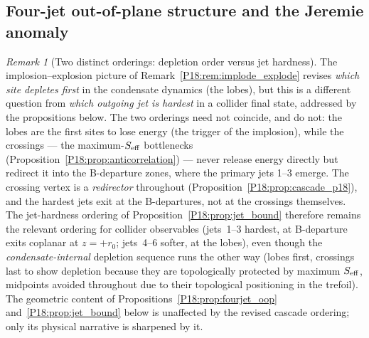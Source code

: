 \documentclass[11pt,a4paper]{article}
\theoremstyle{definition}\newtheorem{definition}[theorem]{Definition}
\theoremstyle{remark}
\newtheorem{remark}[theorem]{Remark}
\begin{document}
\subsection{Four-jet out-of-plane structure and the Jeremie anomaly}
\label{P18:sec:fourjet}

\begin{remark}[Two distinct orderings: depletion order versus jet hardness]
\label{P18:rem:two_orderings}
The implosion--explosion picture of Remark~\ref{P18:rem:implode_explode}
revises \emph{which site depletes first} in the condensate dynamics
(the lobes), but this is a different question from \emph{which
outgoing jet is hardest} in a collider final state, addressed by the
propositions below.  The two orderings need not coincide, and do not:
the lobes are the first sites to lose energy (the trigger of the
implosion), while the crossings --- the maximum-$S_{\rm eff}$
bottlenecks (Proposition~\ref{P18:prop:anticorrelation}) --- never
release energy directly but redirect it into the B-departure zones,
where the primary jets 1--3 emerge.  The crossing vertex is a
\emph{redirector} throughout (Proposition~\ref{P18:prop:cascade_p18}), and
the hardest jets exit at the B-departures, not at the crossings
themselves.  The jet-hardness ordering of
Proposition~\ref{P18:prop:jet_bound} therefore remains the relevant
ordering for collider observables (jets~1--3 hardest, at B-departure
exits coplanar at $z=+r_0$; jets~4--6 softer, at the lobes), even
though the \emph{condensate-internal} depletion sequence runs the
other way (lobes first, crossings last to show depletion because
they are topologically protected by maximum $S_{\rm eff}$, midpoints
avoided throughout due to their topological positioning in the
trefoil).  The geometric content of
Propositions~\ref{P18:prop:fourjet_oop} and~\ref{P18:prop:jet_bound} below is
unaffected by the revised cascade ordering; only its physical
narrative is sharpened by it.
\end{remark}
\end{document}
